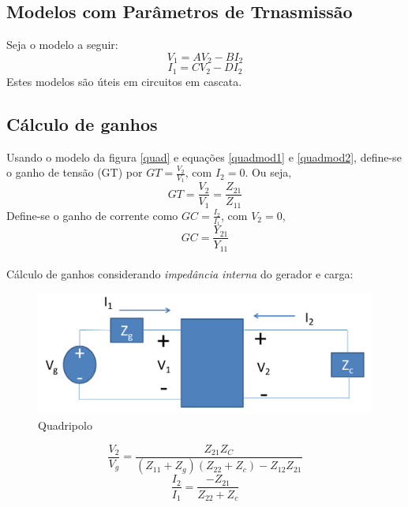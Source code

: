 \documentclass[a4paper, 12pt]{article}
\begin{document}
	\subsection{Modelos com Parâmetros de Trnasmissão}
	Seja o modelo a seguir:
		\begin{equation}
			V_1 = AV_2 - BI_2
		\end{equation}
		\begin{equation}
			I_1 = CV_2 - DI_2
		\end{equation}
		Estes modelos são úteis em circuitos em cascata.

	\subsection{Cálculo de ganhos}
		Usando o modelo da figura \ref{quad} e equações \ref{quadmod1} e \ref{quadmod2}, define-se o ganho de tensão (GT) por $GT = \frac{V_2}{V_1}$, com $I_2 = 0$. Ou seja,\\
		\begin{equation}
			GT = \frac{V_2}{V_1} = \frac{Z_{21}}{Z_{11}}
		\end{equation}
		Define-se o ganho de corrente como $GC = \frac{I_2}{I_1}$, com $V_2 = 0$,
		\begin{equation}
			GC = \frac{Y_{21}}{Y_{11}}
		\end{equation}\\
		
		Cálculo de ganhos considerando\textit{ impedância interna }do gerador e carga:	
		\begin{figure}[h]
			\centering
			\includegraphics[scale=0.4]{a8.png}
			\caption{Quadripolo}
		\end{figure}	

		\begin{equation}
			\frac{V_2}{V_g} = \frac{Z_{21}Z_C}{(Z_{11} + Z_g)(Z_{22} + Z_c) - Z_{12}Z_{21}}
		\end{equation}
		\begin{equation}
			\frac{I_2}{I_1} = \frac{-Z_{21}}{Z_{22} + Z_c}
		\end{equation}
\end{document}
